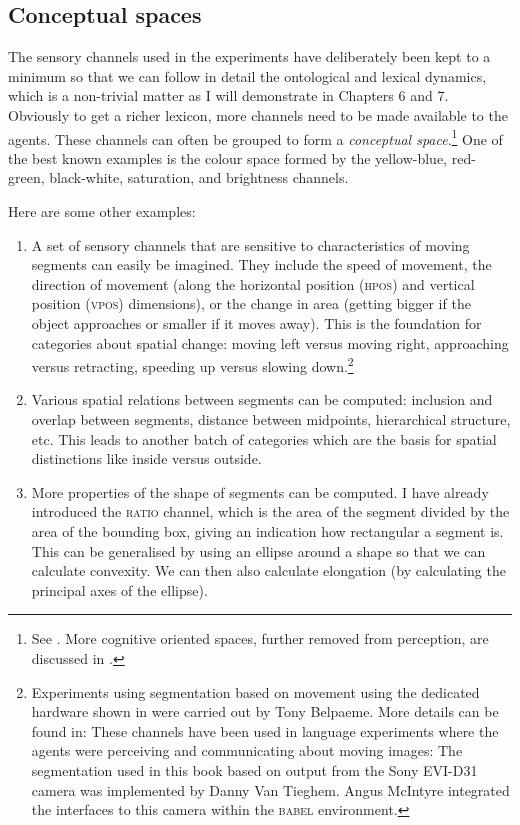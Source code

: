 \subsection{Conceptual spaces}

The sensory channels used in the experiments have
deliberately been kept to a minimum so that we can follow 
in detail the ontological and lexical dynamics, which is a 
non-trivial matter as I will demonstrate in Chapters 6 and 7.
Obviously to get a richer lexicon, more channels need to be made 
available to the agents. These channels can often be 
grouped to form a {\itshape conceptual space}.\footnote{See \cite{Gardenfors:1999}. 
More cognitive oriented spaces, further removed 
from perception, are discussed in \cite{Fauconnier:1994}.} One of the 
best known examples is the colour space formed by the
yellow-blue, red-green, black-white, saturation, and brightness channels. 

\clearpage
Here are some other examples: 
\begin{enumerate}
\item A set of sensory channels that are sensitive 
to characteristics of moving segments can easily be 
imagined. They include the speed
of movement, the direction of movement (along the 
horizontal position (\textsc{hpos}) and vertical position (\textsc{vpos}) 
dimensions), or the change in area (getting bigger if the object 
approaches or smaller if it moves away). This is the foundation
for categories about spatial change: moving left versus moving right,
approaching versus retracting, speeding up versus slowing down.\footnote{Experiments
using segmentation based on movement
using the dedicated hardware shown in  were carried out by Tony Belpaeme. 
More details can be found in: \cite{Belpaeme:1998} These channels have been used in
language experiments where the agents were 
perceiving and communicating about moving 
images: \cite{Steels:1998}  
The segmentation used in this book 
based on output from the Sony EVI-D31 camera was 
implemented by Danny Van Tieghem. Angus McIntyre integrated
the interfaces to this camera within the \textsc{babel} environment. 
}

\item Various spatial relations between segments can be computed: 
inclusion and overlap between segments, distance between 
midpoints, hierarchical structure, etc. 
This leads to another batch of categories which are
the basis for spatial distinctions like inside versus outside. 

\item More properties of the shape of segments can be computed.
I have already introduced the \textsc{ratio} channel, which is the area of the 
segment divided by the area of the bounding box, giving an 
indication how rectangular a segment is. This can be generalised
by using an ellipse around a shape so that we can calculate
convexity. We can then also calculate elongation (by calculating
the principal axes of the ellipse). 
\end{enumerate}

